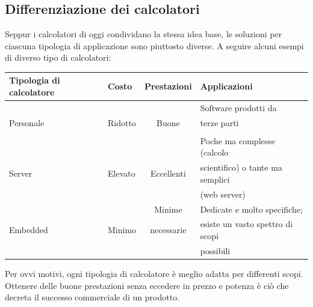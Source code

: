 \subsection{Differenziazione dei calcolatori}
Seppur i calcolatori di oggi condividano la stessa idea base, le soluzioni per ciascuna tipologia di applicazione sono piuttosto diverse. A seguire alcuni esempi di diverso tipo di calcolatori:
\begin{table}[h!]
	\begin{tabular}{|l|l|l|l|}
		\hline
		\rowcolor[HTML]{EFEFEF} 
		Tipologia di calcolatore & Costo   & Prestazioni                     & Applicazioni                     \\ \hline
		&         &                                 & Software prodotti da             \\
		Personale                & Ridotto & \multicolumn{1}{c|}{Buone}      & terze parti                      \\
		&         &                                 &                                  \\ \hline
		&         &                                 & Poche ma complesse (calcolo      \\
		Server                   & Elevato & \multicolumn{1}{c|}{Eccellenti} & scientifico) o tante ma semplici \\
		&         &                                 & (web server)                     \\ \hline
		&         & \multicolumn{1}{c|}{Minime}     & Dedicate e molto specifiche;     \\
		Embedded                 & Minimo  & \multicolumn{1}{c|}{necessarie} & esiste un vasto spettro di scopi \\
		&         &                                 & possibili                        \\ \hline
	\end{tabular}
\end{table}
Per ovvi motivi, ogni tipologia di calcolatore è meglio adatta per differenti scopi. Ottenere delle buone prestazioni senza eccedere in prezzo e potenza è ciò che decreta il successo commerciale di un prodotto.

